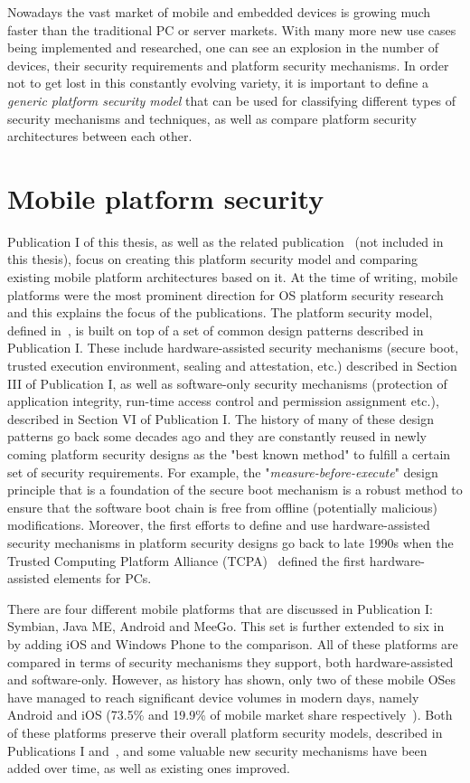 
Nowadays the vast market of mobile and embedded devices is growing much faster than the traditional PC or server markets. With many more new use cases being implemented and researched, one can see an explosion in the number of devices, their security requirements and platform security mechanisms. In order not to get lost in this constantly evolving variety, it is important to define a \textit{generic platform security model} that can be used for classifying different types of security mechanisms and techniques, as well as compare platform security architectures between each other. 

\section{Mobile platform security}

Publication I of this thesis, as well as the related publication~\cite{2013Asokan} (not included in this thesis), focus on creating this platform security model and comparing existing mobile platform architectures based on it. At the time of writing, mobile platforms were the most prominent direction for OS platform security research and this explains the focus of the publications. The platform security model, defined in~\cite{2013Asokan}, is built on top of a set of common design patterns described in Publication I. These include hardware-assisted security mechanisms (secure boot, trusted execution environment, sealing and attestation, etc.) described in Section III of Publication I, as well as software-only security mechanisms (protection of application integrity, run-time access control and permission assignment etc.), described in Section VI of Publication I. The history of many of these design patterns go back some decades ago and they are constantly reused in newly coming platform security designs as the "best known method" to fulfill a certain set of security requirements. For example, the "\textit{measure-before-execute}" design principle that is a foundation of the secure boot mechanism is a robust method to ensure that the software boot chain is free from offline (potentially malicious) modifications. Moreover, the first efforts to define and use hardware-assisted security mechanisms in platform security designs go back to late 1990s when the Trusted Computing Platform Alliance (TCPA)~\cite{pearson2002} defined the first hardware-assisted elements for PCs.

There are four different mobile platforms that are discussed in Publication I: Symbian, Java ME, Android and MeeGo. This set is further extended to six in~\cite{2013Asokan} by adding iOS and Windows Phone to the comparison. All of these platforms are compared in terms of security mechanisms they support, both hardware-assisted and software-only. However, as history has shown, only two of these mobile OSes have managed to reach significant device volumes in modern days, namely Android and iOS (73.5\% and 19.9\% of mobile market share respectively~\cite{osshare}). Both of these platforms preserve their overall platform security models, described in Publications I and~\cite{2013Asokan}, and some valuable new security mechanisms have been added over time, as well as existing ones improved. 

